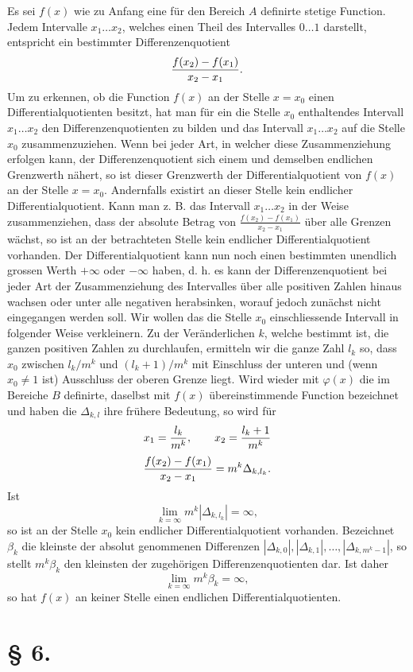 \documentclass[11pt,a4paper]{article}
\begin{document}
Es sei $f(x)$ wie zu Anfang eine für den Bereich $A$ definirte stetige Function. Jedem Intervalle $x_1\ldots x_2$, welches einen Theil des Intervalles $0\ldots1$ darstellt, entspricht ein bestimmter Differenzenquotient
\[
 {f(x_2)-f(x_1)\over x_2-x_1}.
\]
Um zu erkennen, ob die Function $f(x)$ an der Stelle $x=x_0$ einen Differentialquotienten besitzt, hat man für ein die Stelle $x_0$ enthaltendes Intervall $x_1\ldots x_2$ den Differenzenquotienten zu bilden und das Intervall $x_1\ldots x_2$ auf die Stelle $x_0$ zusammenzuziehen. Wenn bei jeder Art, in welcher diese Zusammenziehung erfolgen kann, der Differenzenquotient sich einem und demselben endlichen Grenzwerth nähert, so ist dieser Grenzwerth der Differentialquotient von $f(x)$ an der Stelle $x=x_0$. Andernfalls existirt an dieser Stelle kein endlicher Differentialquotient. Kann man z. B. das Intervall $x_1\ldots x_2$ in der Weise zusammenziehen, dass der absolute Betrag von $\frac{f(x_2)-f(x_1)}{x_2-x_1}$ über alle Grenzen wächst, so ist an der betrachteten Stelle kein endlicher Differentialquotient vorhanden. Der Differentialquotient kann nun noch einen bestimmten unendlich grossen Werth $+\infty$ oder $-\infty$ haben, d. h. es kann der Differenzenquotient bei jeder Art der Zusammenziehung des Intervalles über alle positiven Zahlen hinaus wachsen oder unter alle negativen herabsinken, worauf jedoch zunächst nicht eingegangen werden soll. Wir wollen das die Stelle $x_0$ einschliessende Intervall in folgender Weise verkleinern. Zu der Veränderlichen $k$, welche bestimmt ist, die ganzen positiven Zahlen zu durchlaufen, ermitteln wir die ganze Zahl $l_k$ so, dass $x_0$ zwischen $l_k/m^k$ und $(l_k+1)/m^k$ mit Einschluss der unteren und (wenn $x_0\ne1$ ist) Ausschluss der oberen Grenze liegt. Wird wieder mit $\varphi(x)$ die im Bereiche $B$ definirte, daselbst mit $f(x)$ übereinstimmende Function bezeichnet und haben die $\Delta_{k,l}$ ihre frühere Bedeutung, so wird für
\[
 x_1={l_k\over m^k},\qquad x_2={l_k+1\over m^k}
\]
\[
 {f(x_2)-f(x_1)\over x_2-x_1}=m^k\Delta_{k,l_k}.
\]
Ist
\[
 \lim_{k=\infty}m^k|\Delta_{k,l_k}|=\infty,
\]
so ist an der Stelle $x_0$ kein endlicher Differentialquotient vorhanden. Bezeichnet $\beta_k$ die kleinste der absolut genommenen Differenzen $|\Delta_{k,0}|,|\Delta_{k,1}|,\ldots,|\Delta_{k,m^k-1}|$, so stellt $m^k\beta_k$ den kleinsten der zugehörigen Differenzenquotienten dar. Ist daher
\[
 \lim_{k=\infty}m^k\beta_k=\infty,
\]
so hat $f(x)$ an keiner Stelle einen endlichen Differentialquotienten.

\section*{§ 6.}
\end{document}
